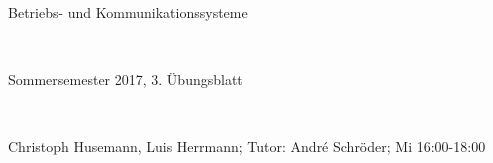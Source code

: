 \documentclass[numbers=noendperiod]{scrartcl}
\begin{document}
	
	\newcommand{\inputmintedframed}[2]{
		\begin{mdframed}[linecolor=bg,backgroundcolor=bg]
			\inputminted[mathescape,breaklines,linenos,numbersep=5pt,tabsize=3]{#1}{#2}
	\end{mdframed}}
	
	\hrulefill
	\begin{center}
		\bfseries %
		\sffamily %
		\begin{huge}
			Betriebs- und Kommunikationssysteme
		\end{huge}\\
		\begin{Large}
			Sommersemester 2017, 3. Übungsblatt
		\end{Large}\\
		\begin{small}
			Christoph Husemann, Luis Herrmann; Tutor: André Schröder; Mi 16:00-18:00
		\end{small}
		
		\vspace{-10pt}
	\end{center}
	\hrulefill
	
\end{document}
